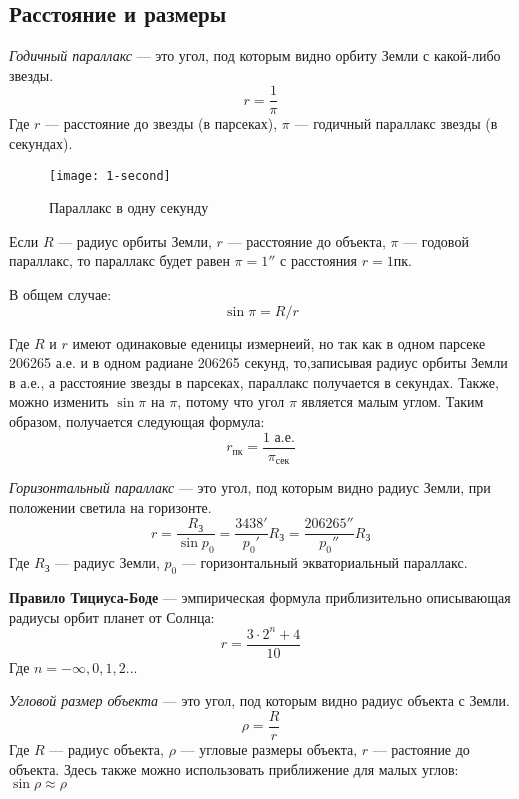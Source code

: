 \subsection{Расстояние и размеры}
\textit{Годичный параллакс} --- это угол, под которым видно орбиту Земли с какой-либо звезды.
\begin{equation}r=\frac{1}{\pi}
\end{equation}
Где $r$ --- расстояние до звезды (в парсеках), $\pi$ --- годичный параллакс звезды (в секундах).
\begin{figure}[!h]
\centering
\texttt{[image: 1-second]}
\caption{Параллакс в одну секунду}
\end{figure}

Если $R$ --- радиус орбиты Земли, $r$ --- расстояние до объекта, $\pi$ --- годовой параллакс, то параллакс будет равен $\pi=1''$ с расстояния $r=1$пк.

В общем случае: 
\begin{equation}
\sin\pi=R/r
\end{equation}

Где $R$ и $r$ имеют одинаковые еденицы измернеий, но так как в одном парсеке 206265 а.е. и в одном радиане 206265 секунд, то,записывая радиус орбиты Земли в а.е., а расстояние звезды в парсеках, параллакс получается в секундах. Также, можно изменить $\sin\pi$ на $\pi$, потому что угол $\pi$ является малым углом. Таким образом, получается следующая формула:\begin{equation}
r_{\text{пк}}=\frac{1\text{ а.е.}}{\pi_{\text{сек}}}
\end{equation}


\textit{Горизонтальный параллакс} --- это угол, под которым видно радиус Земли, при положении светила на горизонте.
\begin{equation}r=\frac{R_{\text{З}}}{\sin p_0}=\frac{3438'}{p_0'}R_{\text{З}}=\frac{206265''}{p_0''}R_{\text{З}}
\end{equation}
Где $R_{\text{З}}$ --- радиус Земли, $p_0$ --- горизонтальный экваториальный параллакс.

\textbf{Правило Тициуса-Боде} --- эмпирическая формула приблизительно описывающая радиусы орбит планет от Солнца:
\begin{equation}r=\frac{3\cdot 2^n+4}{10}
\end{equation}
Где $n=-\infty, 0, 1, 2...$

\textit{Угловой размер объекта} --- это угол, под которым видно радиус объекта с Земли.
\begin{equation}\rho=\frac{R}{r}
\end{equation}
Где $R$ --- радиус объекта, $\rho$ --- угловые размеры объекта, $r$ --- растояние до объекта. Здесь также можно использовать приближение для малых углов: $\sin\rho\approx\rho$